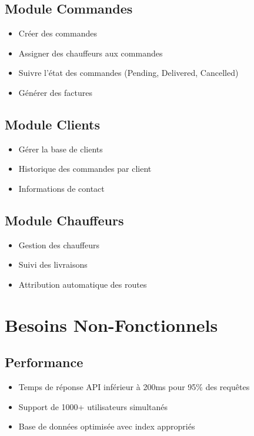 \documentclass[12pt,a4paper]{report}
\begin{document}
\subsection{Module Commandes}
\begin{itemize}
    \item Créer des commandes
    \item Assigner des chauffeurs aux commandes
    \item Suivre l'état des commandes (Pending, Delivered, Cancelled)
    \item Générer des factures
\end{itemize}

\subsection{Module Clients}
\begin{itemize}
    \item Gérer la base de clients
    \item Historique des commandes par client
    \item Informations de contact
\end{itemize}

\subsection{Module Chauffeurs}
\begin{itemize}
    \item Gestion des chauffeurs
    \item Suivi des livraisons
    \item Attribution automatique des routes
\end{itemize}

\section{Besoins Non-Fonctionnels}

\subsection{Performance}
\begin{itemize}
    \item Temps de réponse API inférieur à 200ms pour 95\% des requêtes
    \item Support de 1000+ utilisateurs simultanés
    \item Base de données optimisée avec index appropriés
\end{itemize}
\end{document}

